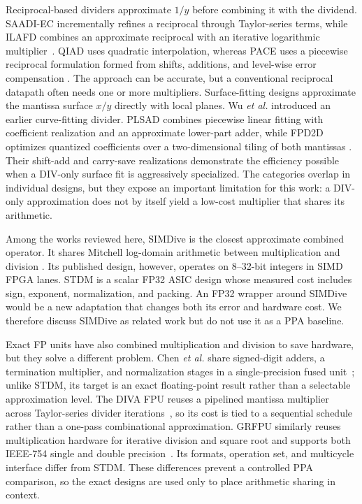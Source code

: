 \documentclass[conference]{IEEEtran}
\begin{document}
Reciprocal-based dividers approximate $1/y$ before combining it with the
dividend. SAADI-EC incrementally refines a reciprocal through Taylor-series
terms, while ILAFD combines an approximate reciprocal with an iterative
logarithmic multiplier~\cite{melchert2019saadi,oelund2023ilafd}. QIAD uses
quadratic interpolation, whereas PACE uses a piecewise reciprocal formulation
formed from shifts, additions, and level-wise error compensation
\cite{liu2023qiad,wen2025pace}. The approach can be accurate, but a
conventional reciprocal datapath often needs one or more multipliers.
Surface-fitting designs approximate the mantissa surface $x/y$ directly with
local planes. Wu \emph{et al.} introduced an earlier curve-fitting divider.
PLSAD combines piecewise linear fitting with coefficient realization and an
approximate lower-part adder, while FPD2D optimizes quantized coefficients over
a two-dimensional tiling of both mantissas
\cite{wu2015curve,wu2024plsad,dimeo2025fpd2d}. Their shift-add and carry-save
realizations demonstrate the efficiency possible when a DIV-only surface fit
is aggressively specialized. The categories
overlap in individual designs, but they expose an important limitation for this
work: a DIV-only approximation does not by itself yield a low-cost multiplier
that shares its arithmetic.

Among the works reviewed here, SIMDive is the closest approximate combined
operator. It shares Mitchell log-domain arithmetic between multiplication and division
\cite{ebrahimi2020simdive}. Its published design, however, operates on
8--32-bit integers in SIMD FPGA lanes. STDM is a scalar FP32 ASIC design whose
measured cost includes sign, exponent, normalization, and packing. An FP32
wrapper around SIMDive would be a new adaptation that changes both its error
and hardware cost. We therefore discuss SIMDive as related work but do not use
it as a PPA baseline.

Exact FP units have also combined multiplication and division to save
hardware, but they solve a different problem. Chen \emph{et al.} share
signed-digit adders, a termination multiplier, and normalization stages in a
single-precision fused unit~\cite{chen2004fused}; unlike STDM, its target is an
exact floating-point result rather than a selectable approximation level. The
DIVA FPU reuses a pipelined mantissa multiplier across Taylor-series divider
iterations~\cite{kwon2004diva}, so its cost is tied to a sequential schedule
rather than a one-pass combinational approximation. GRFPU similarly reuses
multiplication hardware for iterative division and square root and supports
both IEEE-754 single and double precision~\cite{gaislergrfpu}. Its formats,
operation set, and multicycle interface differ from STDM. These differences
prevent a controlled PPA comparison, so the exact designs are used only to
place arithmetic sharing in context.
\end{document}
